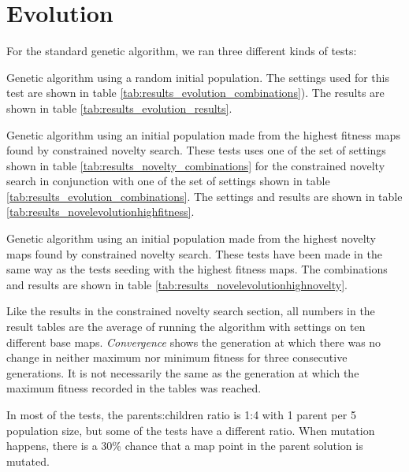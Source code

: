 \section{Evolution}
\label{results_evolution}



For the standard genetic algorithm, we ran three different kinds of tests:

\begin{my_itemize}

	\item Genetic algorithm using a random initial population. The settings used for this test are shown in table \ref{tab:results_evolution_combinations}). The results are shown in table \ref{tab:results_evolution_results}. 

	\item Genetic algorithm using an initial population made from the highest fitness maps found by constrained novelty search. These tests uses one of the set of settings shown in table \ref{tab:results_novelty_combinations} for the constrained novelty search in conjunction with one of the set of settings shown in table \ref{tab:results_evolution_combinations}. The settings and results are shown in table \ref{tab:results_novelevolutionhighfitness}.

	\item Genetic algorithm using an initial population made from the highest novelty maps found by constrained novelty search. These tests have been made in the same way as the tests seeding with the highest fitness maps. The combinations and results are shown in table \ref{tab:results_novelevolutionhighnovelty}.

\end{my_itemize}

Like the results in the constrained novelty search section, all numbers in the result tables are the average of running the algorithm with settings on ten different base maps. \textit{Convergence} shows the generation at which there was no change in neither maximum nor minimum fitness for three consecutive generations. It is not necessarily the same as the generation at which the maximum fitness recorded in the tables was reached.

In most of the tests, the parents:children ratio is 1:4 with 1 parent per 5 population size, but some of the tests have a different ratio. When mutation happens, there is a 30\% chance that a map point in the parent solution is mutated.

